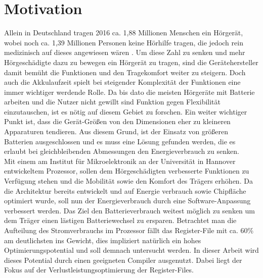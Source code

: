 \section{Motivation}
\label{sec:motivation}
Allein in Deutschland tragen 2016 ca. 1,88 Millionen Menschen ein Hörgerät, wobei noch ca. 1,39 Millionen Personen keine Hörhilfe tragen, die jedoch rein medizinisch auf dieses angewiesen wären \cite{statistica}. Um diese Zahl zu senken und mehr Hörgeschädigte dazu zu bewegen ein Hörgerät zu tragen, sind die Gerätehersteller damit bemüht die Funktionen und den Tragekomfort weiter zu steigern. Doch auch die Akkulaufzeit spielt bei steigender Komplexität der Funktionen eine immer wichtiger werdende Rolle. Da bis dato die meisten Hörgeräte mit Batterie arbeiten und die Nutzer nicht gewillt sind Funktion gegen Flexibilität einzutauschen, ist es nötig auf diesem Gebiet zu forschen. Ein weiter wichtiger Punkt ist, dass die Gerät-Größen von den Dimensionen eher zu kleineren Apparaturen tendieren. Aus diesem Grund, ist der Einsatz von größeren Batterien ausgeschlossen und es muss eine Lösung gefunden werden, die es erlaubt bei gleichbleibenden Abmessungen den Energieverbrauch zu senken.\\
Mit einem am Institut für Mikroelektronik an der Universität in Hannover entwickeltem Prozessor, sollen dem Hörgeschädigten verbesserte Funktionen zu Verfügung stehen und die Mobilität sowie den Komfort des Trägers erhöhen. Da die Architektur bereits entwickelt und auf Energie verbrauch sowie Chipfläche optimiert wurde, soll nun der Energieverbrauch durch eine Software-Anpassung verbessert werden.
Das Ziel den Batterieverbrauch weitest möglich zu senken um dem Träger einen lästigen Batteriewechsel zu ersparen.
Betrachtet man die Aufteilung des Stromverbrauchs im Prozessor fällt das Register-File mit ca. 60\% am deutlichsten ins Gewicht, dies impliziert natürlich ein hohes Optimierungspotential und soll demnach untersucht werden. In dieser Arbeit wird dieses Potential durch einen geeigneten Compiler ausgenutzt. Dabei liegt der Fokus auf der Verlustleistungsoptimierung der Register-Files.


